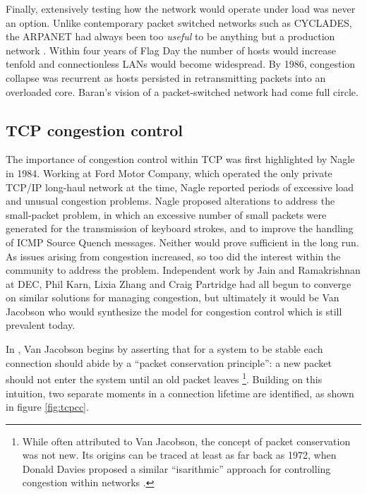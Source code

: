 Finally, extensively testing how the network would operate under load was never an option. 
Unlike contemporary packet switched networks such as CYCLADES, the \ac{ARPANET} had always been too \textit{useful} to be anything but a production network \cite{Day:2010p187}. 
Within four years of Flag Day the number of hosts would increase tenfold and connectionless \acp{LAN} would become widespread. 
By 1986, congestion collapse was recurrent as hosts persisted in retransmitting packets into an overloaded core.
Baran's vision of a packet-switched network had come full circle.

\subsection{TCP congestion control}
\label{sec:resourcepooling:tcp}

The importance of congestion control within \ac{TCP} was first highlighted by Nagle \cite{Nagle:1984p458} in 1984. 
Working at Ford Motor Company, which operated the only private \ac{TCP}/\ac{IP} long-haul network at the time, Nagle reported periods of excessive load and unusual congestion problems. 
Nagle proposed alterations to address the small-packet problem, in which an excessive number of small packets were generated for the transmission of keyboard strokes, and to improve the handling of \ac{ICMP} Source Quench messages. 
Neither would prove sufficient in the long run.  
As issues arising from congestion increased, so too did the interest within the community to address the problem. 
Independent work by Jain and Ramakrishnan at \ac{DEC}, Phil Karn, Lixia Zhang and Craig Partridge had all begun to converge on similar solutions for managing congestion, but ultimately it would be Van Jacobson who would synthesize the model for congestion control which is still prevalent today.

In \cite{Jacobson:1988p398}, Van Jacobson begins by asserting that for a system to be stable each connection should abide by a ``packet conservation principle'': a new packet should not enter the system until an old packet leaves \footnote{While often attributed to Van Jacobson, the concept of packet conservation was not new. Its origins can be traced at least as far back as 1972, when Donald Davies proposed a similar ``isarithmic'' approach for controlling congestion within networks \cite{Davies:1972p473}.}. 
Building on this intuition, two separate moments in a connection lifetime are identified, as shown in figure \ref{fig:tcpcc}. 

